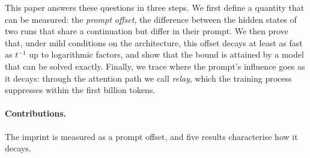 \documentclass[11pt]{article}
\theoremstyle{definition}
\theoremstyle{remark}
\begin{document}
This paper answers these questions in three steps. We first define a quantity that can be measured: the \emph{prompt offset}, the difference between the hidden states of two runs that share a continuation but differ in their prompt. We then prove that, under mild conditions on the architecture, this offset decays at least as fast as $t^{-1}$ up to logarithmic factors, and show that the bound is attained by a model that can be solved exactly. Finally, we trace where the prompt's influence goes as it decays: through the attention path we call \emph{relay}, which the training process suppresses within the first billion tokens.

\paragraph{Contributions.} The imprint is measured as a prompt offset, and five results characterise how it decays.
\end{document}
